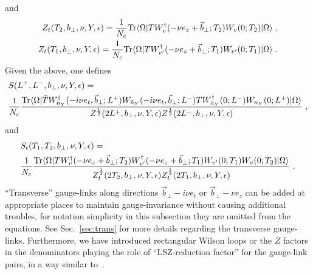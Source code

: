 \documentclass[a4paper,11pt]{article}
\begin{document}
and 
\begin{align}
Z_t(T_2,b_\perp,\nu,Y,\epsilon)=\frac{1}{N_c}{\rm Tr}\langle \Omega|TW^{\dagger}_{v}(-\nu e_z+\vec{b}_\perp;T_2)W_{v}(0;T_2)|\Omega \rangle \ , \\
Z_t(T_1,b_\perp,\nu,Y,\epsilon)=\frac{1}{N_c}{\rm Tr}\langle \Omega|TW^{\dagger}_{v'}(-\nu e_z+\vec{b}_\perp;T_1)W_{v'}(0;T_1)|\Omega \rangle \ .
\end{align}
Given the above, one defines
\begin{align}\label{eq:Sallthree}
&S(L^+,L^-,b_\perp, \nu, Y,\epsilon)=\nonumber \\
&\frac{1}{N_c}\frac{{\rm Tr}\langle \Omega|\bar{T} W_{n_Y}^{\dagger}(-i\nu e_t,\vec{b}_\perp;L^+)W_{\bar n_Y}(-i\nu e_t,\vec{b}_\perp;L^-)TW_{\bar n_Y}^{\dagger}(0;L^-)W_{n_Y}(0;L^+)|\Omega\rangle}{Z^{\frac{1}{2}}(2L^+,b_\perp,\nu,Y,\epsilon)Z^{\frac{1}{2}}(2L^-,b_\perp,\nu,Y,\epsilon)} \ ,
\end{align}
and
\begin{align}\label{eq:Stallthree}
&S_t(T_1,T_2,b_\perp,\nu,Y,\epsilon)=\nonumber \\
&\frac{1}{N_c}\frac{{\rm Tr}\langle \Omega|TW^{\dagger}_{v}(-\nu e_z+\vec{b}_\perp;T_2)W^{\dagger}_{v'}(-\nu e_z+\vec{b}_\perp;T_1)W_{v'}(0;T_1)W_{v}(0;T_2)|\Omega \rangle}{Z_t^{\frac{1}{2}}(2T_2,b_\perp,\nu,Y,\epsilon)Z_t^{\frac{1}{2}}(2T_1,b_\perp,\nu,Y,\epsilon)} \ .
\end{align}
``Transverse''  gauge-links along directions $\vec{b}_\perp -i\nu e_t$ or $\vec{b}_\perp -\nu e_z$ can be added at appropriate places to maintain gauge-invariance without causing additional troubles, for notation simplicity in this subsection they are omitted from the equations. See Sec.~\ref{sec:trans} for more details regarding the transverse gauge-links. Furthermore,  we have introduced rectangular Wilson loops or the $Z$ factors in the denominators playing the role of ``LSZ-reduction factor'' for the gauge-link pairs, in a way similar to~\cite{Ji:2019sxk}.
\end{document}
